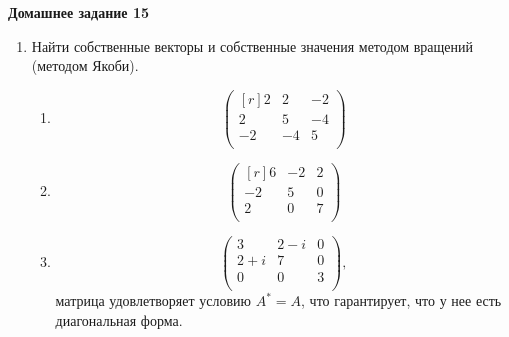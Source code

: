 \documentclass[12pt]{article}
\theoremstyle{definition}
\numberwithin{equation}{section}
\begin{document}
\textbf{Домашнее задание 15}\begin{enumerate}
\item Найти собственные векторы и собственные значения методом вращений (методом Якоби).
\begin{enumerate}
    \item \[\begin{pmatrix}[r]
2 & 2 & -2\\
2 & 5 & -4\\
-2 & -4 & 5\\
\end{pmatrix}\]
\item \[\begin{pmatrix}[r]
6 & -2 & 2\\
-2 & 5 & 0\\
2 & 0 & 7\\
\end{pmatrix}\]
\item \[\begin{pmatrix}
3 & 2-i & 0\\
2+i & 7 & 0\\
0 & 0 & 3\\
\end{pmatrix},\] матрица удовлетворяет условию $A^*=A$, что гарантирует, что у нее есть диагональная форма.
\end{enumerate}
\end{enumerate}
~\\
\end{document}

